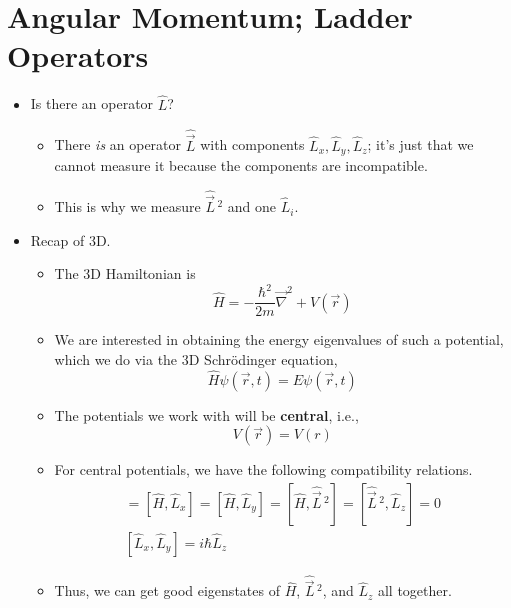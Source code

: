 \documentclass[../notes.tex]{subfiles}
\begin{document}
\section{Angular Momentum; Ladder Operators}
\begin{itemize}
    \item {}Is there an operator $\hat{L}$?
    \begin{itemize}
        \item There \emph{is} an operator $\hat{\vec{L}}$ with components $\hat{L}_x,\hat{L}_y,\hat{L}_z$; it's just that we cannot measure it because the components are incompatible.
        \item This is why we measure $\hat{\vec{L}}{\,}^2$ and one $\hat{L}_i$.
    \end{itemize}
    \item Recap of 3D.
    \begin{itemize}
        \item The 3D Hamiltonian is
        \begin{equation*}
            \hat{H} = -\frac{\hbar^2}{2m}\vec{\nabla}^2+V(\vec{r})
        \end{equation*}
        \item We are interested in obtaining the energy eigenvalues of such a potential, which we do via the 3D Schr\"{o}dinger equation,
        \begin{equation*}
            \hat{H}\psi(\vec{r},t) = E\psi(\vec{r},t)
        \end{equation*}
        \item The potentials we work with will be \textbf{central}, i.e.,
        \begin{equation*}
            V(\vec{r}) = V(r)
        \end{equation*}
        \item For central potentials, we have the following compatibility relations.
        \begin{gather*}
            [\hat{H},\hat{L}_z] = [\hat{H},\hat{L}_x]
                = [\hat{H},\hat{L}_y]
                = [\hat{H},\hat{\vec{L}}{\,}^2]
                = [\hat{\vec{L}}{\,}^2,\hat{L}_z]
                = 0\\
            [\hat{L}_x,\hat{L}_y] = i\hbar\hat{L}_z
        \end{gather*}
        \item Thus, we can get good eigenstates of $\hat{H}$, $\hat{\vec{L}}{\,}^2$, and $\hat{L}_z$ all together.
        \begin{itemize}

\end{itemize}
\end{itemize}
\end{itemize}
\end{document}
